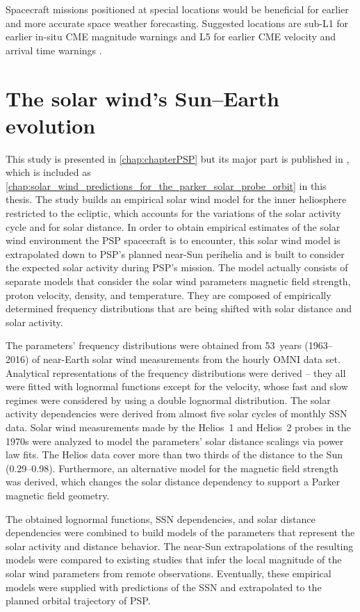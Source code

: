 Spacecraft missions positioned at special locations would be beneficial for earlier and more accurate space weather forecasting. Suggested locations are sub-L1 for earlier in-situ CME magnitude warnings and L5 for earlier CME velocity and arrival time warnings \citep{Vourlidas2015}.

\clearpage


\section{The solar wind's Sun--Earth evolution}
This study is presented in \autoref{chap:chapterPSP} but its major part is published in \citet{Venzmer2018}, which is included as \autoref{chap:solar_wind_predictions_for_the_parker_solar_probe_orbit} in this thesis.
The study builds an empirical solar wind model for the inner heliosphere restricted to the ecliptic, which accounts for the variations of the solar activity cycle and for solar distance. In order to obtain empirical estimates of the solar wind environment the PSP spacecraft is to encounter, this solar wind model is extrapolated down to PSP's planned near-Sun perihelia and is built to consider the expected solar activity during PSP's mission.
The model actually consists of separate models that consider the solar wind parameters magnetic field strength, proton velocity, density, and temperature. They are composed of empirically determined frequency distributions that are being shifted with solar distance and solar activity.

The parameters' frequency distributions were obtained from 53~years (1963--2016) of near-Earth solar wind measurements from the hourly OMNI data set. Analytical representations of the frequency distributions were derived -- they all were fitted with lognormal functions except for the velocity, whose fast and slow regimes were considered by using a double lognormal distribution. The solar activity dependencies were derived from almost five solar cycles of monthly SSN data. Solar wind measurements made by the Helios~1 and Helios~2 probes in the 1970s were analyzed to model the parameters' solar distance scalings via power law fits. The Helios data cover more than two thirds of the distance to the Sun (\SIrange{0.29}{0.98}{\au}). Furthermore, an alternative model for the magnetic field strength was derived, which changes the solar distance dependency to support a Parker magnetic field geometry.

The obtained lognormal functions, SSN dependencies, and solar distance dependencies were combined to build models of the parameters that represent the solar activity and distance behavior. The near-Sun extrapolations of the resulting models were compared to existing studies that infer the local magnitude of the solar wind parameters from remote observations. Eventually, these empirical models were supplied with predictions of the SSN and extrapolated to the planned orbital trajectory of PSP.

